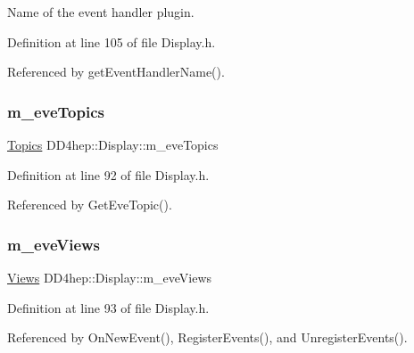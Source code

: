 Name of the event handler plugin. 



Definition at line 105 of file Display.\+h.



Referenced by get\+Event\+Handler\+Name().

\hypertarget{class_d_d4hep_1_1_display_a2b79f980245e444a7d9e70d09b043e07}{}\label{class_d_d4hep_1_1_display_a2b79f980245e444a7d9e70d09b043e07} 
\subsubsection{\texorpdfstring{m\+\_\+eve\+Topics}{m\_eveTopics}}
{\footnotesize\ttfamily \hyperlink{class_d_d4hep_1_1_display_ab7cf442eb2211f57f55b7cd1cf8a61c1}{Topics} D\+D4hep\+::\+Display\+::m\+\_\+eve\+Topics\hspace{0.3cm}{\ttfamily [protected]}}



Definition at line 92 of file Display.\+h.



Referenced by Get\+Eve\+Topic().

\hypertarget{class_d_d4hep_1_1_display_a5cbd62240a063355076bc617b80a7120}{}\label{class_d_d4hep_1_1_display_a5cbd62240a063355076bc617b80a7120} 
\subsubsection{\texorpdfstring{m\+\_\+eve\+Views}{m\_eveViews}}
{\footnotesize\ttfamily \hyperlink{class_d_d4hep_1_1_display_a93fcdf6ec0390291e26d59d0d78cd6e8}{Views} D\+D4hep\+::\+Display\+::m\+\_\+eve\+Views\hspace{0.3cm}{\ttfamily [protected]}}



Definition at line 93 of file Display.\+h.



Referenced by On\+New\+Event(), Register\+Events(), and Unregister\+Events().

\hypertarget{class_d_d4hep_1_1_display_a7b83daeea2f4100c2ce0d92d0f417ed7}{}\label{class_d_d4hep_1_1_display_a7b83daeea2f4100c2ce0d92d0f417ed7} 
